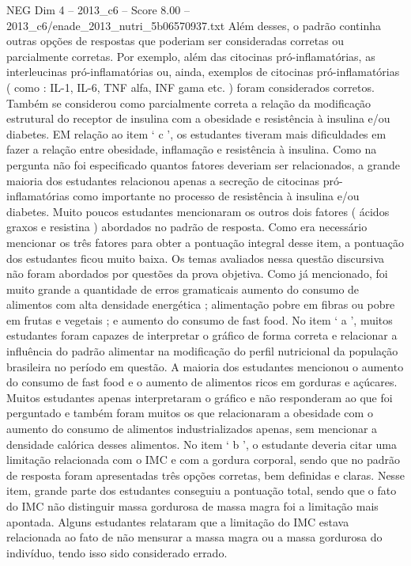 \begin{textsample}{NEG Dim 4 – 2013\_c6 – Score 8.00 – 2013\_c6/enade\_2013\_nutri\_5b06570937.txt}
Além desses, o padrão continha outras opções de respostas que poderiam ser consideradas corretas ou parcialmente corretas.
Por exemplo, além das citocinas pró-inflamatórias, as interleucinas pró-inflamatórias ou, ainda, exemplos de citocinas pró-inflamatórias ( como : IL-1, IL-6, TNF alfa, INF gama etc. ) foram considerados corretos.
Também se considerou como parcialmente correta a relação da modificação estrutural do receptor de insulina com a obesidade e resistência à insulina e/ou diabetes.
EM relação ao item ‘ c ’, os estudantes tiveram mais dificuldades em fazer a relação entre obesidade, inflamação e resistência à insulina.
Como na pergunta não foi especificado quantos fatores deveriam ser relacionados, a grande maioria dos estudantes relacionou apenas a secreção de citocinas pró-inflamatórias como importante no processo de resistência à insulina e/ou diabetes.
Muito poucos estudantes mencionaram os outros dois fatores ( ácidos graxos e resistina ) abordados no padrão de resposta.
Como era necessário mencionar os três fatores para obter a pontuação integral desse item, a pontuação dos estudantes ficou muito baixa.
Os temas avaliados nessa questão discursiva não foram abordados por questões da prova objetiva.
Como já mencionado, foi muito grande a quantidade de erros gramaticais aumento do consumo de alimentos com alta densidade energética ; alimentação pobre em fibras ou pobre em frutas e vegetais ; e aumento do consumo de fast food.
No item ‘ a ’, muitos estudantes foram capazes de interpretar o gráfico de forma correta e relacionar a influência do padrão alimentar na modificação do perfil nutricional da população brasileira no período em questão.
A maioria dos estudantes mencionou o aumento do consumo de fast food e o aumento de alimentos ricos em gorduras e açúcares.
Muitos estudantes apenas interpretaram o gráfico e não responderam ao que foi perguntado e também foram muitos os que relacionaram a obesidade com o aumento do consumo de alimentos industrializados apenas, sem mencionar a densidade calórica desses alimentos.
No item ‘ b ’, o estudante deveria citar uma limitação relacionada com o IMC e com a gordura corporal, sendo que no padrão de resposta foram apresentadas três opções corretas, bem definidas e claras.
Nesse item, grande parte dos estudantes conseguiu a pontuação total, sendo que o fato do IMC não distinguir massa gordurosa de massa magra foi a limitação mais apontada.
Alguns estudantes relataram que a limitação do IMC estava relacionada ao fato de não mensurar a massa magra ou a massa gordurosa do indivíduo, tendo isso sido considerado errado.

\end{textsample}
